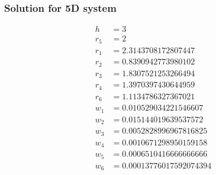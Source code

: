 \documentclass{beamer}
\begin{document}
\begin{frame}
\frametitle{Solution for 5D system}
\small
\begin{align}
h&=3 \nonumber \\
r_5&=2\nonumber\\
r_1&=2.3143708172807447\nonumber\\
r_2&=0.8390942773980102\nonumber\\
r_3&=1.8307521253266494\nonumber\\
r_4&=1.3970397430644959\nonumber\\
r_6&=1.1134786327367021\nonumber\\
w_1 &= 0.010529034221546607\nonumber\\
w_2 &= 0.015144019639537572\nonumber\\
w_3 &= 0.0052828996967816825\nonumber\\
w_4&=0.0010671298950159158\nonumber\\
w_5&=0.0006510416666666666\nonumber\\
w_6 &= 0.00013776017592074394 
\end{align}
\end{frame}
\end{document}
